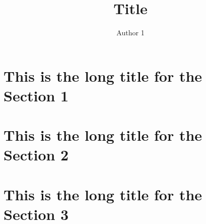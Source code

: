 \documentclass[xcolor={dvipsnames},10pt]{beamer}
\title{Title}
\author{Author 1}
\begin{document}
\section[Section 1]{This is the long title for the Section 1}
\section[Section 2]{This is the long title for the Section 2}
\section[Section 3]{This is the long title for the Section 3}
\end{document}
